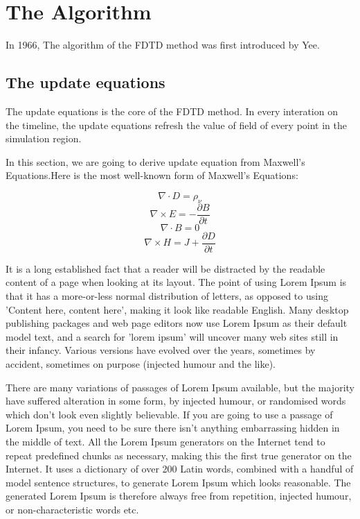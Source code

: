 \section{The Algorithm}

In 1966, The algorithm of the FDTD method was first introduced by Yee.

\subsection{The update equations}

The update equations is the core of the FDTD method. In every interation on the timeline, the update equations refresh
the value of field of every point in the simulation region.

In this section, we are going to derive update equation from Maxwell's Equations.Here is the most well-known form of
Maxwell's Equations:

\begin{displaymath}
  \nabla \cdot D = \rho_{\nu}
\end{displaymath}
\begin{displaymath}
    \nabla \times E = -\frac{\partial B}{\partial t}
\end{displaymath}
\begin{displaymath}
  \nabla \cdot B = 0
\end{displaymath}
\begin{displaymath}
  \nabla \times H = J + \frac{\partial D}{\partial t}
\end{displaymath}

It is a long established fact that a reader will be distracted by the readable content of a page when looking at its
layout. The point of using Lorem Ipsum is that it has a more-or-less normal distribution of letters, as opposed to using
'Content here, content here', making it look like readable English. Many desktop publishing packages and web page
editors now use Lorem Ipsum as their default model text, and a search for 'lorem ipsum' will uncover many web sites
still in their infancy. Various versions have evolved over the years, sometimes by accident, sometimes on purpose
(injected humour and the like).

There are many variations of passages of Lorem Ipsum available, but the majority have suffered alteration in some form,
by injected humour, or randomised words which don't look even slightly believable. If you are going to use a passage of
Lorem Ipsum, you need to be sure there isn't anything embarrassing hidden in the middle of text. All the Lorem Ipsum
generators on the Internet tend to repeat predefined chunks as necessary, making this the first true generator on the
Internet. It uses a dictionary of over 200 Latin words, combined with a handful of model sentence structures, to
generate Lorem Ipsum which looks reasonable. The generated Lorem Ipsum is therefore always free from repetition,
injected humour, or non-characteristic words etc.




